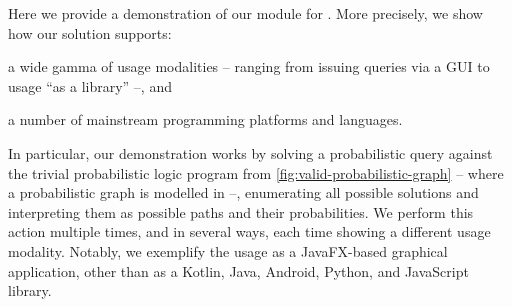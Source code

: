 \documentclass[12pt,a4paper,openright,twoside]{book}
\begin{document}
Here we provide a demonstration of our \problog{} module for \twopkt{}.
%
More precisely, we show how our solution supports:
%
\begin{inlinelist}
    \item a wide gamma of usage modalities -- ranging from issuing \problog{} queries via a GUI to usage ``as a library'' --, and
    \item a number of mainstream programming platforms and languages.
\end{inlinelist}

In particular, our demonstration works by solving a probabilistic query against the trivial probabilistic logic program from \cref{fig:valid-probabilistic-graph} -- where a probabilistic graph is modelled in \problog{} --, enumerating all possible solutions and interpreting them as possible paths and their probabilities.
%
We perform this action multiple times, and in several ways, each time showing a different usage modality.
%
Notably, we exemplify the usage \problog{} as a JavaFX-based graphical application, other than as a Kotlin, Java, Android, Python, and JavaScript library.
\end{document}

